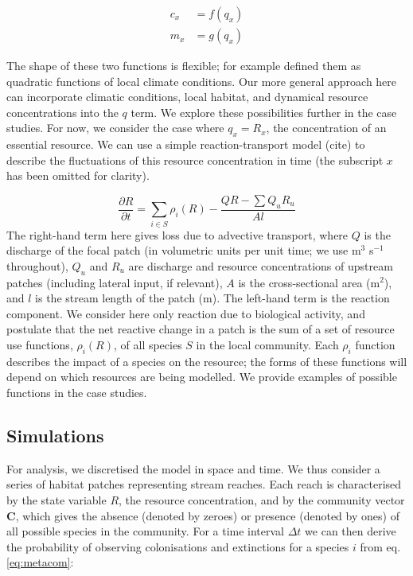 \documentclass[11pt,a4paper]{article}
\begin{document}
\begin{equation}
\begin{split}
	c_{x} &= f(q_{x}) \label{eq:talluto} \\
	m_{x} &= g(q_{x})
\end{split}
\end{equation}


The shape of these two functions is flexible; for example \textcite{Talluto2017} defined them as quadratic functions of local climate conditions.
Our more general approach here can incorporate climatic conditions, local habitat, and dynamical resource concentrations into the $q$ term.
We explore these possibilities further in the case studies.
For now, we consider the case where $q_x = R_x$, the concentration of an essential resource.
We can use a simple reaction-transport model (cite) to describe the fluctuations of this resource concentration in time (the subscript $x$ has been omitted for clarity).

\begin{equation}
	\frac{\partial R}{\partial t} = \sum_{i \in S}{\rho_i(R)} -\frac{QR - \sum Q_u R_u}{A l} 
	\label{eq:rxn_transport}
\end{equation}
The right-hand term here gives loss due to advective transport, where $Q$ is the discharge of the focal patch (in volumetric units per unit time; we use m$^3$ s$^{-1}$ throughout), $Q_u$ and $R_u$ are discharge and resource concentrations of upstream patches (including lateral input, if relevant), $A$ is the cross-sectional area (m$^2$), and $l$ is the stream length of the patch (m).
The left-hand term is the reaction component.
We consider here only reaction due to biological activity, and postulate that the net reactive change in a patch is the sum of a set of resource use functions, $\rho_i(R)$, of all species $S$ in the local community. 
Each $\rho_i$ function describes the impact of a species on the resource; the forms of these functions will depend on which resources are being modelled.
We provide examples of possible functions in the case studies.


\subsection{Simulations}

For analysis, we discretised the model in space and time.
We thus consider a series of habitat patches representing stream reaches.
Each reach is characterised by the state variable $R$, the resource concentration, and by the community vector $\mathbf{C}$, which gives the absence (denoted by zeroes) or presence (denoted by ones) of all possible species in the community.
For a time interval $\Delta t$ we can then derive the probability of observing colonisations and extinctions for a species $i$ from eq. \ref{eq:metacom}:
\end{document}
